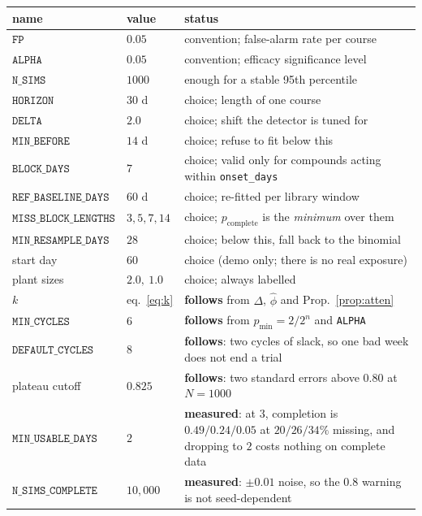 \documentclass{article}
\theoremstyle{plain}
\theoremstyle{definition}
\theoremstyle{remark}
\numberwithin{equation}{section}
\begin{document}
\begin{center}
\begin{tabular}{llp{7.6cm}}
name & value & status \\
\hline
$\texttt{FP}$ & $0.05$ & convention; false-alarm rate per course \\
$\texttt{ALPHA}$ & $0.05$ & convention; efficacy significance level \\
$\texttt{N\_SIMS}$ & $1000$ & enough for a stable 95th percentile \\
$\texttt{HORIZON}$ & $30$ d & choice; length of one course \\
$\texttt{DELTA}$ & $2.0$ & choice; shift the detector is tuned for \\
$\texttt{MIN\_BEFORE}$ & $14$ d & choice; refuse to fit below this \\
$\texttt{BLOCK\_DAYS}$ & $7$ & choice; valid only for compounds acting within \texttt{onset\_days} \\
$\texttt{REF\_BASELINE\_DAYS}$ & $60$ d & choice; re-fitted per library window \\
$\texttt{MISS\_BLOCK\_LENGTHS}$ & $3,5,7,14$ & choice; $p_{\mathrm{complete}}$ is the \emph{minimum} over them \\
$\texttt{MIN\_RESAMPLE\_DAYS}$ & $28$ & choice; below this, fall back to the binomial \\
start day & $60$ & choice (demo only; there is no real exposure) \\
plant sizes & $2.0,\ 1.0$ & choice; always labelled \\
\hline
$k$ & eq.~\eqref{eq:k} & \textbf{follows} from $\Delta$, $\hat\phi$ and Prop.~\ref{prop:atten} \\
$\texttt{MIN\_CYCLES}$ & $6$ & \textbf{follows} from $p_{\min}=2/2^n$ and \texttt{ALPHA} \\
$\texttt{DEFAULT\_CYCLES}$ & $8$ & \textbf{follows}: two cycles of slack, so one bad week does not end a trial \\
plateau cutoff & $0.825$ & \textbf{follows}: two standard errors above $0.80$ at $N=1000$ \\
\hline
$\texttt{MIN\_USABLE\_DAYS}$ & $2$ & \textbf{measured}: at $3$, completion is $0.49/0.24/0.05$ at $20/26/34\%$ missing, and dropping to $2$ costs nothing on complete data \\
$\texttt{N\_SIMS\_COMPLETE}$ & $10{,}000$ & \textbf{measured}: $\pm 0.01$ noise, so the $0.8$ warning is not seed-dependent \\
\end{tabular}
\end{center}
\end{document}
